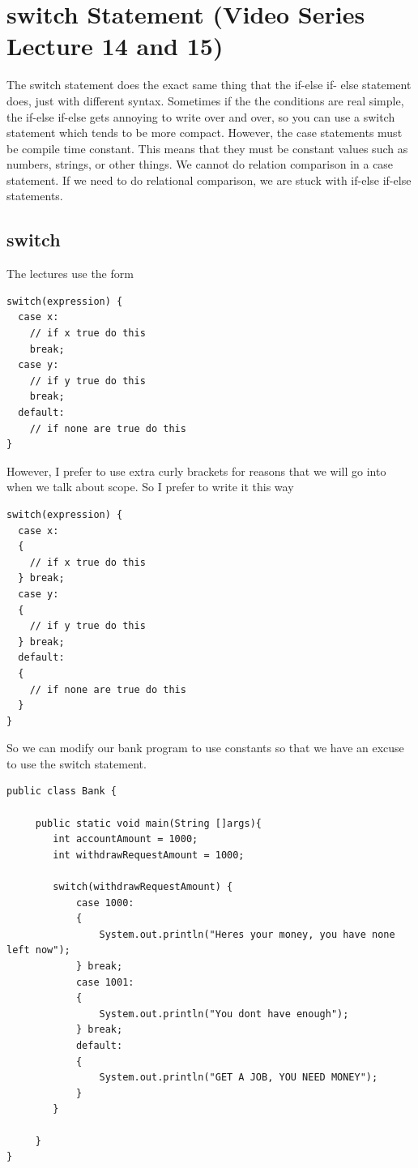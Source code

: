 \documentclass[11]{article}
\begin{document}
\section{switch Statement (Video Series Lecture 14 and 15)}
The switch statement does the exact same thing that the if-else if- else statement does, just with different syntax. Sometimes if the the conditions are real simple, the if-else if-else gets annoying to write over and over, so you can use a switch statement which tends to be more compact. However, the case statements must be compile time constant. This means that they must be constant values such as numbers, strings, or other things. We cannot do relation comparison in a case statement. If we need to do relational comparison, we are stuck with if-else if-else statements.

\subsection{switch}
The lectures use the form
\begin{lstlisting}
switch(expression) {
  case x:
    // if x true do this
    break;
  case y:
    // if y true do this
    break;
  default:
    // if none are true do this
}
\end{lstlisting}

However, I prefer to use extra curly brackets for reasons that we will go into when we talk about scope. So I prefer to write it this way

\begin{lstlisting}
switch(expression) {
  case x:
  {
    // if x true do this
  } break;
  case y:
  {
    // if y true do this
  } break;
  default:
  {
    // if none are true do this
  }
}
\end{lstlisting}

So we can modify our bank program to use constants so that we have an excuse to use the switch statement.

\begin{lstlisting}
public class Bank {

     public static void main(String []args){
        int accountAmount = 1000;
        int withdrawRequestAmount = 1000;
        
        switch(withdrawRequestAmount) {
            case 1000:
            {
                System.out.println("Heres your money, you have none left now");
            } break;
            case 1001:
            {
                System.out.println("You dont have enough");
            } break;
            default:
            {
                System.out.println("GET A JOB, YOU NEED MONEY");
            }
        }
        
     }
}
\end{lstlisting}
\end{document}
